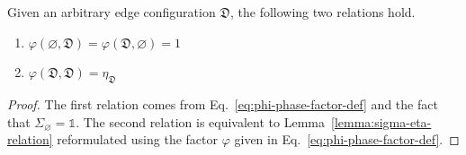 \begin{lemma}\label{thm:phi-self}
 Given an arbitrary edge configuration $\mathfrak{D}$, the following two relations hold.
 
\begin{enumerate}
    \item [(i)] $\varphi(\varnothing, \mathfrak{D}) = \varphi(\mathfrak{D},\varnothing)= 1$
    \item [(ii)] $\varphi(\mathfrak{D},\mathfrak{D}) = \eta_{\mathfrak{D}}$
\end{enumerate}
\begin{proof}
    The first relation comes from Eq.~\eqref{eq:phi-phase-factor-def} and the fact that $\Sigma_\varnothing = \mathds{1}$. The second relation is equivalent to Lemma~\ref{lemma:sigma-eta-relation} reformulated using the factor $\varphi$ given in Eq.~\eqref{eq:phi-phase-factor-def}.
\end{proof}
\end{lemma}

